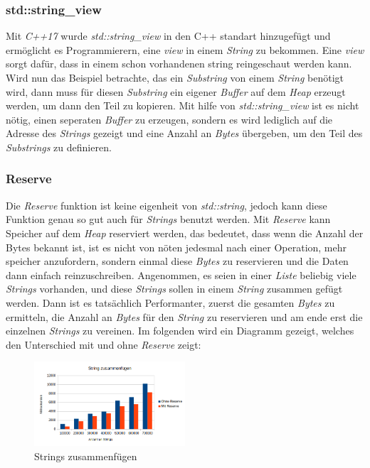 \subsubsection{std::string\_view}
Mit \emph{C++17} wurde \emph{std::string\_view} in den C++ standart hinzugefügt und ermöglicht es
Programmierern, eine \emph{view} in einem \emph{String} zu bekommen. Eine \emph{view} sorgt
dafür, dass in einem schon vorhandenen string reingeschaut werden kann. Wird nun das Beispiel
betrachte, das ein \emph{Substring} von einem \emph{String} benötigt wird, dann muss für diesen
\emph{Substring} ein eigener \emph{Buffer} auf dem \emph{Heap} erzeugt werden, um dann den Teil
zu kopieren. Mit hilfe von \emph{std::string\_view} ist es nicht nötig, einen seperaten
\emph{Buffer} zu erzeugen, sondern es wird lediglich auf die Adresse des \emph{Strings} gezeigt
und eine Anzahl an \emph{Bytes} übergeben, um den Teil des \emph{Substrings} zu definieren.
\newline
\subsubsection{Reserve}
Die \emph{Reserve} funktion ist keine eigenheit von \emph{std::string}, jedoch kann diese
Funktion genau so gut auch für \emph{Strings} benutzt werden. Mit \emph{Reserve} kann Speicher
auf dem \emph{Heap} reserviert werden, das bedeutet, dass wenn die Anzahl der Bytes bekannt ist,
ist es nicht von nöten jedesmal nach einer Operation, mehr speicher anzufordern, sondern einmal
diese \emph{Bytes} zu reservieren und die Daten dann einfach reinzuschreiben. Angenommen, es
seien in einer \emph{Liste} beliebig viele \emph{Strings} vorhanden, und diese \emph{Strings}
sollen in  einem \emph{String} zusammen gefügt werden. Dann ist es tatsächlich Performanter,
zuerst die gesamten \emph{Bytes} zu ermitteln, die Anzahl an \emph{Bytes} für den \emph{String} zu
reservieren und am ende erst die einzelnen \emph{Strings} zu vereinen. Im folgenden wird ein
Diagramm gezeigt, welches den Unterschied mit und ohne \emph{Reserve} zeigt:
\begin{figure}[h]
	\centering
	\includegraphics[width=0.5\textwidth]{bilder/StringReserve}
	\caption[StringsZusammenfügen]{Strings zusammenfügen}
	\label{img:StringsZusammenfügen}
\end{figure}